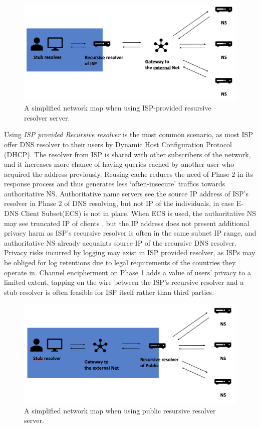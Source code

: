 \begin{figure}[h!]
    \begin{center}
    \includegraphics*[width=0.9\columnwidth]{img/isp-recursive}
    \end{center}
    \caption{A simplified network map when using ISP-provided resursive resolver server.}
    \label{isprecursive}
\end{figure}
Using \textit{ISP provided Recursive resolver} is the most common scenario, as most ISP offer DNS resolver to their users by Dynamic Host Configuration Protocol (DHCP).
The resolver from ISP is shared with other subscribers of the network, and it increases more chance of having queries cached by another user who acquired the address previously.
Reusing cache reduces the need of Phase 2 in its response process \cite{wang2013analysis} and thus generates less `often-insecure' traffics towards authoritative NS. 
Authoritative name servers see the source IP address of ISP's resolver in Phase 2 of DNS resolving, but not IP of the individuals, in case E-DNS Client Subset(ECS) is not in place.
When ECS is used, the authoritative NS may see truncated IP of clients \cite{kintis2016understanding}, but the IP address does not present additional privacy harm as ISP's recursive resolver is often in the same subnet IP range, and authoritative NS already acquaints source IP of the recursive DNS resolver. 
Privacy risks incurred by logging may exist in ISP provided resolver, as ISPs may be obliged for log retentions due to legal requirements of the countries they operate in.
Channel encipherment on Phase 1 adds a value of users' privacy to a limited extent, tapping on the wire between the ISP's recursive resolver and a stub resolver is often feasible for ISP itself rather than third parties.

\begin{figure}[h!]
    \begin{center}
    \includegraphics*[width=0.9\columnwidth]{img/public-recursive}
    \end{center}
    \caption{A simplified network map when using public resursive resolver server.}
    \label{publicrecursive}
\end{figure}

